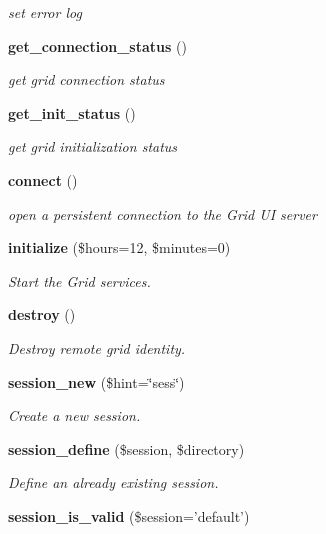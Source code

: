 \begin{CompactItemize}
\begin{CompactList}\small\item\em set error log \item\end{CompactList}\item 
{\bf get\_\-connection\_\-status} ()
\begin{CompactList}\small\item\em get grid connection status \item\end{CompactList}\item 
{\bf get\_\-init\_\-status} ()
\begin{CompactList}\small\item\em get grid initialization status \item\end{CompactList}\item 
{\bf connect} ()
\begin{CompactList}\small\item\em open a persistent connection to the Grid UI server \item\end{CompactList}\item 
{\bf initialize} (\$hours=12, \$minutes=0)
\begin{CompactList}\small\item\em Start the Grid services. \item\end{CompactList}\item 
{\bf destroy} ()
\begin{CompactList}\small\item\em Destroy remote grid identity. \item\end{CompactList}\item 
{\bf session\_\-new} (\$hint=\char`\"{}sess\char`\"{})
\begin{CompactList}\small\item\em Create a new session. \item\end{CompactList}\item 
{\bf session\_\-define} (\$session, \$directory)
\begin{CompactList}\small\item\em Define an already existing session. \item\end{CompactList}\item 
{\bf session\_\-is\_\-valid} (\$session='default')

\end{CompactItemize}
